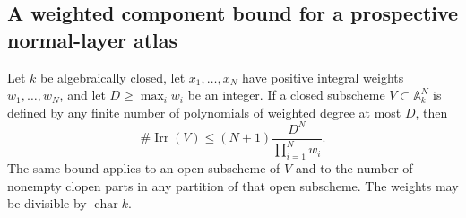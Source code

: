 \subsection{A weighted component bound for a prospective normal-layer atlas}

\begin{lemma}
\label{D:weighted-affine-component-bound}
Let $k$ be algebraically closed, let $x_1,\ldots,x_N$ have
positive integral weights $w_1,\ldots,w_N$, and let
$D\geq\max_i w_i$ be an integer. If a closed subscheme
$V\subset\mathbb A^N_k$ is defined by any finite number of
polynomials of weighted degree at most $D$, then
\[
       \#\operatorname{Irr}(V)
          \leq (N+1)\frac{D^N}{\prod_{i=1}^N w_i}.
                                                        \tag{D.WB.1}
\]
The same bound applies to an open subscheme of $V$ and to the
number of nonempty clopen parts in any partition of that open
subscheme. The weights may be divisible by $\operatorname{char}k$.
\end{lemma}

